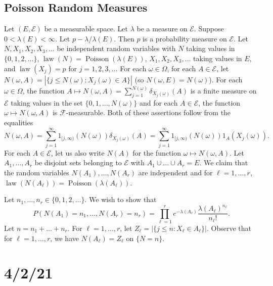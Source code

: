 \documentclass{article}
\DeclareMathOperator{\law}{law}
\DeclareMathOperator{\Poisson}{Poisson}
\newcommand{\F}{\mathscr{F}}
\theoremstyle{definition}
\begin{document}
\subsection*{Poisson Random Measures}
Let $(E, \mathscr{E})$ be a measurable space. Let $\lambda$ be a measure on $\mathscr{E}$. Suppose $0 < \lambda(E) < \infty$. Let $p - \lambda/\lambda(E)$. Then $p$ is a probability measure on $\mathscr{E}$. Let $N, X_1, X_2, X_3, \dots$ be independent random variables with $N$ taking values in $\{0, 1, 2, \dots\}$, $\law(N) = \Poisson(\lambda(E))$, $X_1, X_2, X_3, \dots$ taking values in $E$, and $\law(X_j) = p$ for $j = 1, 2, 3, \dots$ For each $\omega \in \Omega$, for each $A \in \mathscr{E}$, let $N(\omega, A) = |\{j \leq N(\omega) : X_j(\omega) \in A\}|$ (so $N(\omega, E) = N(\omega)$).
For each $\omega \in \Omega$, the function $A \mapsto N(\omega, A) = \sum_{j=1}^{N(\omega)} \delta_{X_j(\omega)}(A)$ is a finite measure on $\mathscr{E}$ taking values in the set $\{0, 1, \dots, N(\omega)\}$ and for each $A \in \mathscr{E}$, the function $\omega \mapsto N(\omega, A)$ is $\F$-measurable. Both of these assertions follow from the equalities
\[
    N(\omega, A) = \sum_{j=1}^\infty 1_{[j, \infty)}(N(\omega))\delta_{X_j(\omega)}(A) = \sum_{j=1}^\infty 1_{[j, \infty)}(N(\omega)) 1_A(X_j(\omega)).
\]
For each $A \in \mathscr{E}$, let us also write $N(A)$ for the function $\omega \mapsto N(\omega, A)$. Let $A_1, \dots, A_r$ be disjoint sets belonging to $\mathscr{E}$ with $A_1 \cup \dots \cup A_r = E$. We claim that the random variables $N(A_1), \dots, N(A_r)$ are independent and for $\ell = 1, \dots, r$, $\law(N(A_\ell)) = \Poisson(\lambda(A_\ell))$.

Let $n_1, \dots, n_r \in \{0, 1, 2, \dots\}$. We wish to show that
\[
    P(N(A_1) = n_1, \dots, N(A_r) = n_r) = \prod_{\ell = 1}^r e^{-\lambda(A_\ell)} \frac{\lambda(A_\ell)^{n_\ell}}{n_\ell!}.
\]
Let $n = n_1 + \dots + n_r$. For $\ell = 1, \dots, r$, let $Z_\ell = |\{j \leq n : X_\ell \in A_\ell\}|$. Observe that for $\ell = 1, \dots, r$, we have $N(A_\ell) = Z_\ell$ on $\{N = n\}$.

\section*{4/2/21}
\end{document}
